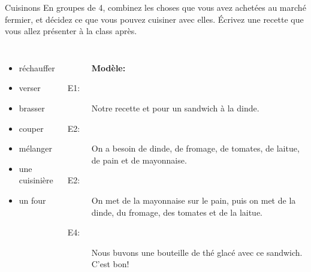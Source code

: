 \begin{frame}{Cuisinons}
  En groupes de 4, combinez les choses que vous avez achetées au marché fermier, et décidez ce que vous pouvez cuisiner avec elles.
  Écrivez une recette que vous allez présenter à la class après.
  \begin{columns}
      \begin{itemize}
        \item réchauffer 
        \item verser 
        \item brasser 
        \item couper 
        \item mélanger 
        \item une cuisinière 
        \item un four 
      \end{itemize}
      \begin{description}
        \item[] \textbf{Modèle:}
        \item[E1:] Notre recette et pour un sandwich à la dinde.
        \item[E2:] On a besoin de dinde, de fromage, de tomates, de laitue, de pain et de mayonnaise.
        \item[E2:] On met de la mayonnaise sur le pain, puis on met de la dinde, du fromage, des tomates et de la laitue.
        \item[E4:] Nous buvons une bouteille de thé glacé avec ce sandwich. C'est bon!
      \end{description}
  \end{columns}
\end{frame}